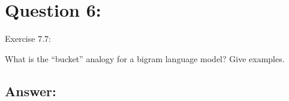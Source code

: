 \section*{Question 6:}
Exercise 7.7: 

What is the ``bucket'' analogy for a bigram language model? Give examples.

\subsection*{Answer:}
